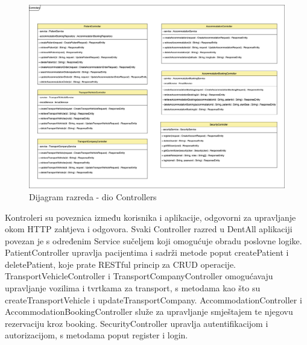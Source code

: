 						
			\begin{figure}[H]
				\includegraphics[scale=0.07]{slike/arhitektura_controller_class_diagram_v2.png} %
				\centering
				\caption{Dijagram razreda - dio Controllers}
				\label{fig:arhitektura_controller_class_diagram}
			\end{figure}
			
			Kontroleri su poveznica između korisnika i aplikacije, odgovorni za upravljanje okom HTTP zahtjeva i odgovora. Svaki Controller razred u DentAll aplikaciji povezan je s određenim Service sučeljem koji omogućuje obradu poslovne logike. PatientController upravlja pacijentima i sadrži metode poput createPatient i deletePatient, koje prate RESTful princip za CRUD operacije. TransportVehicleController i TransportCompanyController omogućavaju upravljanje vozilima i tvrtkama za transport, s metodama kao što su createTransportVehicle i updateTransportCompany. AccommodationController i AccommodationBookingController služe za upravljanje smještajem te njegovu rezervaciju kroz booking. SecurityController upravlja autentifikacijom i autorizacijom, s metodama poput register i login.
			
